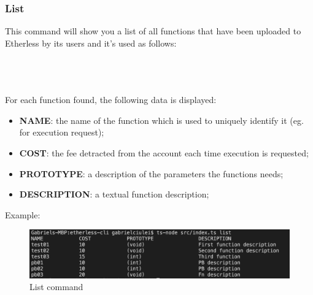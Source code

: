 \subsubsection{List}
This command will show you a list of all functions that have been uploaded to Etherless by its users and it's used as follows:\\\\
\centerline {}\\\\
For each function found, the following data is displayed:
\begin{itemize}
	\item \textbf{NAME}: the name of the function which is used to uniquely identify it (eg. for execution request);
	\item \textbf{COST}: the fee detracted from the account each time execution is requested;
	\item \textbf{PROTOTYPE}: a description of the parameters the functions needs;
	\item \textbf{DESCRIPTION}: a textual function description;
\end{itemize}
Example:
\begin{figure}[h]
	\begin{center}
	\includegraphics[width=\textwidth]{res/img/Screenshot_list.jpg}
	\caption{List command}
	\end{center}
\end{figure}
